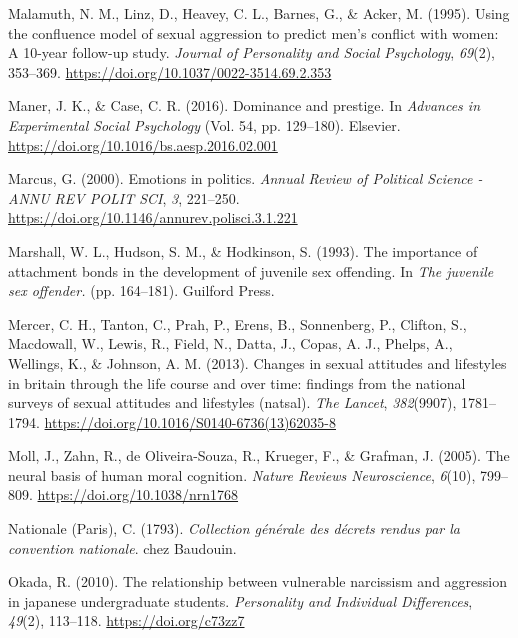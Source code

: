 \documentclass[
  donotrepeattitle,doc, 12pt, a4paper,floatsintext]{apa7}
\newlength{\cslhangindent}
\newlength{\cslentryspacingunit} %
\newenvironment{CSLReferences}[2] %
 {%
  \setlength{\parindent}{0pt}
  \ifodd #1
  \let\oldpar\par
  \def\par{\hangindent=\cslhangindent\oldpar}
  \fi
  \setlength{\parskip}{#2\cslentryspacingunit}
 }%
 {}
\begin{document}
\begin{CSLReferences}{1}{0}
\leavevmode{}%
Malamuth, N. M., Linz, D., Heavey, C. L., Barnes, G., \& Acker, M. (1995). Using the confluence model of sexual aggression to predict men's conflict with women: A 10-year follow-up study. \emph{Journal of Personality and Social Psychology}, \emph{69}(2), 353--369. \url{https://doi.org/10.1037/0022-3514.69.2.353}

\leavevmode{}%
Maner, J. K., \& Case, C. R. (2016). Dominance and prestige. In \emph{Advances in Experimental Social Psychology} (Vol. 54, pp. 129--180). Elsevier. \url{https://doi.org/10.1016/bs.aesp.2016.02.001}

\leavevmode{}%
Marcus, G. (2000). Emotions in politics. \emph{Annual Review of Political Science - ANNU REV POLIT SCI}, \emph{3}, 221--250. \url{https://doi.org/10.1146/annurev.polisci.3.1.221}

\leavevmode{}%
Marshall, W. L., Hudson, S. M., \& Hodkinson, S. (1993). The importance of attachment bonds in the development of juvenile sex offending. In \emph{The juvenile sex offender.} (pp. 164--181). Guilford Press.

\leavevmode{}%
Mercer, C. H., Tanton, C., Prah, P., Erens, B., Sonnenberg, P., Clifton, S., Macdowall, W., Lewis, R., Field, N., Datta, J., Copas, A. J., Phelps, A., Wellings, K., \& Johnson, A. M. (2013). Changes in sexual attitudes and lifestyles in britain through the life course and over time: findings from the national surveys of sexual attitudes and lifestyles (natsal). \emph{The Lancet}, \emph{382}(9907), 1781--1794. \url{https://doi.org/10.1016/S0140-6736(13)62035-8}

\leavevmode{}%
Moll, J., Zahn, R., de Oliveira-Souza, R., Krueger, F., \& Grafman, J. (2005). The neural basis of human moral cognition. \emph{Nature Reviews Neuroscience}, \emph{6}(10), 799--809. \url{https://doi.org/10.1038/nrn1768}

\leavevmode{}%
Nationale (Paris), C. (1793). \emph{Collection générale des décrets rendus par la convention nationale}. chez Baudouin.

\leavevmode{}%
Okada, R. (2010). The relationship between vulnerable narcissism and aggression in japanese undergraduate students. \emph{Personality and Individual Differences}, \emph{49}(2), 113--118. \url{https://doi.org/c73zz7}


\end{CSLReferences}
\end{document}
